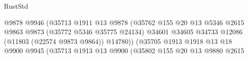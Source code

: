 \begin{lexlean}{RustStd}
\begin{coremodule}
                                                          @9878
                                                          @9946
                                                          (@35713
                                                            @1911
                                                            @13
                                                            @9878
                                                            (@35762
                                                              @155
                                                              @20
                                                              @13
                                                              @5346
                                                              @2615
                                                              @9863
                                                              @9873
                                                              (@35772 @5346 @35775 @24134)
                                                              @34601
                                                              @34605
                                                              @34733
                                                              @12086
                                                              (@11803 (@22574 @9873 @9864))
                                                              @14780))
                                                          (@35705
                                                            @1913
                                                            @1918
                                                            @13
                                                            @18
                                                            @9900
                                                            @9945
                                                            (@35713
                                                              @1913
                                                              @13
                                                              @9900
                                                              (@35802
                                                                @155
                                                                @20
                                                                @13
                                                                @9880
                                                                @2615

\end{coremodule}
\end{lexlean}
